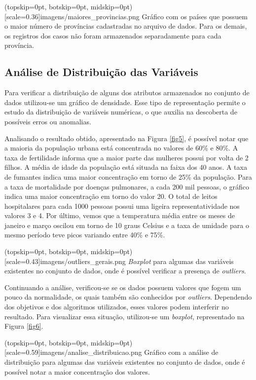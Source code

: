 \documentclass{ieeeaccess}
\begin{document}
\Figure[h!](topskip=0pt, botskip=0pt, midskip=0pt)[scale=0.36]{imagens/{maiores_provincias.png}}
{Gráfico com os países que possuem o maior número de províncias cadastradas no arquivo de dados. Para os demais, os registros dos casos não foram armazenados separadamente para cada província. \label{fig4}}

\subsection{Análise de Distribuição das Variáveis}

Para verificar a distribuição de alguns dos atributos armazenados no conjunto de dados utilizou-se um gráfico de densidade. Esse tipo de representação permite o estudo da distribuição de variáveis numéricas, o que auxilia na descoberta de possíveis erros ou anomalias. 

Analisando o resultado obtido, apresentado na Figura \ref{fig5}, é possível notar que a maioria da população urbana está concentrada no valores de 60\% e 80\%. A taxa de fertilidade informa que a maior parte das mulheres possui por volta de 2 filhos. A média de idade da população está situada na faixa dos 40 anos. A taxa de fumantes indica uma maior concentração em torno de 25\% da população. Para a taxa de mortalidade por doenças pulmonares, a cada 200 mil pessoas, o gráfico indica uma maior concentração em torno do valor 20. O total de leitos hospitalares para cada 1000 pessoas possui uma ligeira representatividade nos valores 3 e 4. Por último, vemos que a temperatura média entre os meses de janeiro e março oscilou em torno de 10 graus Celsius e a taxa de umidade para o mesmo período teve picos variando entre 40\% e 75\%.

\Figure[t!](topskip=0pt, botskip=0pt, midskip=0pt)[scale=0.43]{imagens/{outliers_gerais.png}}
{\textit{Boxplot} para algumas das variáveis existentes no conjunto de dados, onde é possível verificar a presença de  \textit{outliers}. \label{fig6}}

Continuando a análise, verificou-se se os dados possuem valores que fogem um pouco da normalidade, os quais também são conhecidos por \textit{outliers}. Dependendo dos objetivos e dos algoritmos utilizados, esses valores podem interferir no resultado. Para visualizar essa situação, utilizou-se um  \textit{boxplot}, representado na Figura \ref{fig6}.  

\Figure[h!](topskip=0pt, botskip=0pt, midskip=0pt)[scale=0.59]{imagens/{analise_distribuicao.png}}
{Gráfico com a análise de distribuição para algumas das variáveis existentes no conjunto de dados, onde é possível notar a maior concentração dos valores. \label{fig5}}
\end{document}
